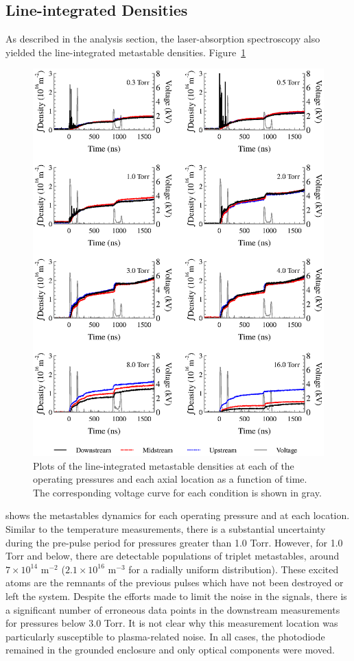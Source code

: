 \subsection{Line-integrated Densities}

As described in the analysis section, the laser-absorption spectroscopy also
yielded the line-integrated metastable densities. Figure~\ref{fig:metastables}
\begin{figure}
  \centering
  \includegraphics{./chapters/metastables/figures/metastables.eps}
  \caption{Plots of the line-integrated metastable densities at each of
  the operating pressures and each axial location as a function of
  time. The corresponding voltage curve for each condition is shown in gray.}
  \label{fig:metastables}
\end{figure}
shows the metastables dynamics for each operating pressure and at each location.
Similar to the temperature measurements, there is a substantial uncertainty
during the pre-pulse period for pressures greater than 1.0 Torr. However, for
1.0 Torr and below, there are detectable populations of triplet metastables,
around $7\times10^{14}$ m$^{-2}$ ($2.1\times10^{16}$ m$^{-3}$ for a radially
uniform distribution). These excited atoms are the remnants of the previous
pulses which have not been destroyed or left the system. Despite the efforts
made to limit the noise in the signals, there is a significant number of
erroneous data points in the downstream measurements for pressures below 3.0
Torr. It is not clear why this measurement location was particularly susceptible
to plasma-related noise. In all cases, the photodiode remained in the grounded
enclosure and only optical components were moved.

